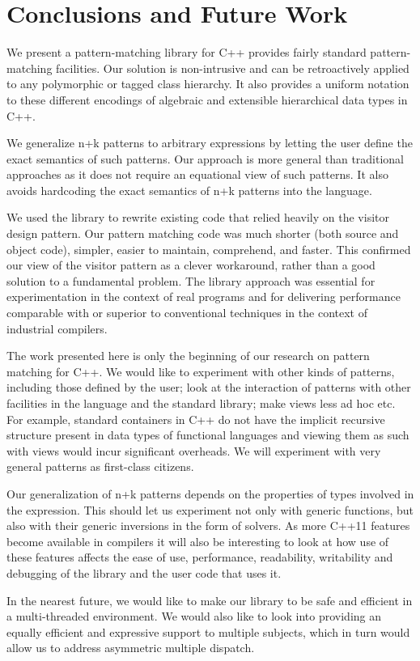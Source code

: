 \section{Conclusions and Future Work} %
\label{sec:cc}

We present a pattern-matching library for C++ provides fairly standard
pattern-matching facilities. Our solution is 
non-intrusive and can be retroactively applied to any polymorphic or tagged 
class hierarchy. It also provides a uniform notation to these different 
encodings of algebraic and extensible hierarchical data types in C++.

We generalize n+k patterns to arbitrary expressions by letting the user define 
the exact semantics of such patterns. Our approach is more general than traditional approaches 
as it does not require an
equational view of such patterns. It also avoids hardcoding the 
exact semantics of n+k patterns into the language. 

We used the library to rewrite existing code that relied heavily on the 
visitor design pattern.
Our pattern matching code was much shorter (both source and object code), 
simpler, easier to maintain, comprehend, and faster. 
This confirmed our view of the visitor pattern as a clever workaround,
rather than a good solution to a fundamental problem.
The library approach was essential 
for experimentation in the context of real programs and for delivering 
performance comparable with or superior to conventional techniques in the 
context of industrial compilers.

The work presented here is only the beginning of our research on pattern 
matching for C++. We would like to experiment with other kinds of patterns, 
including those defined by the user; look at the interaction of patterns with 
other facilities in the language and the standard library; make
views less ad hoc etc. For example, standard containers in C++ do not have the 
implicit recursive structure present in data types of functional languages and 
viewing them as such with views would incur significant overheads. We will
experiment with very general patterns as first-class citizens.

Our generalization of n+k patterns depends on the properties of types involved 
in the expression. This should let us experiment not only with generic 
functions, but also with their generic inversions in the form of solvers. As 
more C++11 features become available in compilers it will also be interesting to 
look at how use of these features affects the ease of use, performance, 
readability, writability and debugging of the library and the user code that 
uses it.

In the nearest future, we would like to make our library to be safe and efficient 
in a multi-threaded environment. We would also like to look into providing an 
equally efficient and expressive support to multiple subjects, which in turn 
would allow us to address asymmetric multiple dispatch.
